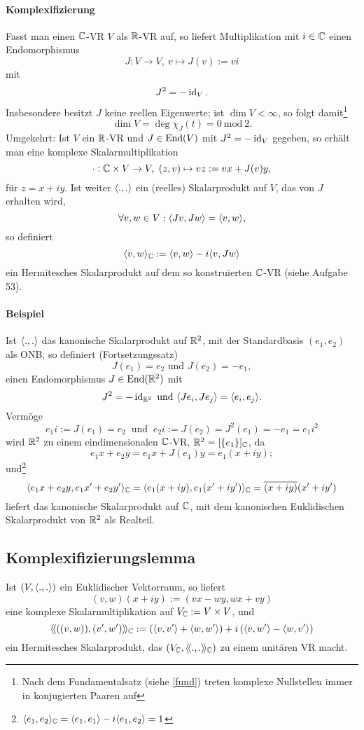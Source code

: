 \paragraph{Komplexifizierung}
	Fasst man einen $ \mathbb{C} $-VR $ V $ als $ \mathbb{R} $-VR auf, so liefert Multiplikation mit $ i\in \mathbb{C} $ einen Endomorphismus
		\[ J:V\to V,\ v\mapsto J(v):= vi \] %
	mit
		\[ J^2 = -\operatorname{id}_V. \]
	Insbesondere besitzt $ J $ keine reellen Eigenwerte;
	ist $ \dim V < \infty $, so folgt damit\footnote{Nach dem Fundamentalsatz (siehe \ref{fund}) treten komplexe Nullstellen immer in konjugierten Paaren auf}
		\[ \dim V = \deg{\chi_J}(t) = 0\ \text{mod}\ 2. \]
	Umgekehrt: Ist $ V $ ein $ \mathbb{R} $-VR und $ J\in \operatorname{End}(V) $ mit $ J^2 = -\operatorname{id}_V $ gegeben, so erhält man eine komplexe Skalarmultiplikation
		\[ \cdot :\mathbb{C}\times V \to V,\ (z,v)\mapsto vz := vx+J(v)y, \]
	für $ z = x+iy $.
	Ist weiter $ \langle .,. \rangle $ ein (reelles) Skalarprodukt auf $ V $, das von $ J $ erhalten wird, 
		\[ \forall v,w\in V: \langle Jv,Jw \rangle = \langle v,w \rangle, \]
	so definiert
		\[ \langle v,w \rangle_{\mathbb{C}} := \langle v,w \rangle -i \langle v,Jw \rangle \]
	ein Hermitesches Skalarprodukt auf dem so konstruierten $ \mathbb{C} $-VR (siehe Aufgabe 53).

\paragraph{Beispiel}\label{JDrehung}
	Ist $ \langle .,. \rangle $ das kanonische Skalarprodukt auf $ \mathbb{R}^2 $, mit der Standardbasis $ (e_1,e_2) $ als ONB, so definiert (Fortsetzungssatz)
		\[ J(e_1) = e_2 \text{ und } J(e_2) = -e_1, \]
	einen Endomorphismus $ J\in\operatorname{End}(\mathbb{R}^2) $ mit
		\[ J^2 = -\operatorname{id}_{\mathbb{R}^2} \text{ und } \langle Je_i,Je_j \rangle = \langle e_i,e_j \rangle. \]
	Vermöge
		\[ e_1i := J(e_1) = e_2\ \text{ und }\ e_2i := J(e_2) = J^2(e_1) = -e_1 = e_1 i^2 \]
	wird $ \mathbb{R}^2 $ zu einem eindimensionalen $ \mathbb{C} $-VR, $ \mathbb{R}^2 = [\{e_1\}]_{\mathbb{C}} $, da
		\[ e_1x+e_2y = e_1x+J(e_1)y = e_1 (x+iy); \]
	und\footnote{$\langle e_1,e_2 \rangle_{\mathbb{C}} = \langle e_1,e_1 \rangle-i\langle e_1,e_2 \rangle=1$}
		\[ \langle e_1x+e_2y,e_1x'+e_2y' \rangle_{\mathbb{C}} = \langle e_1(x+iy),e_1(x'+iy') \rangle_{\mathbb{C}} = \overline{(x+iy)}(x'+iy') \]
	liefert das kanonische Skalarprodukt auf $ \mathbb{C} $, mit dem kanonischen Euklidischen Skalarprodukt von $ \mathbb{R}^2 $ als Realteil.

\subsection{Komplexifizierungslemma}
\begin{Lemma}[Komplexifizierungslemma]
	Ist $ (V,\langle .,. \rangle) $ ein Euklidischer Vektorraum, so liefert
		\[ (v,w)(x+iy) := (vx-wy,wx+vy) \]
	eine komplexe Skalarmultiplikation auf $ V_{\mathbb{C}} := V\times V $, und
		\[ \langle\! \langle ((v,w)),(v',w') \rangle\! \rangle_{\mathbb{C}} := \left(\langle v,v' \rangle+\langle w,w' \rangle \right)+i\left(\langle v,w' \rangle-\langle w,v' \rangle \right) \]
	ein Hermitesches Skalarprodukt, das $ (V_{\mathbb{C}},\langle\! \langle .,. \rangle\! \rangle_{\mathbb{C}}) $ zu einem unitären VR macht.
\end{Lemma}

